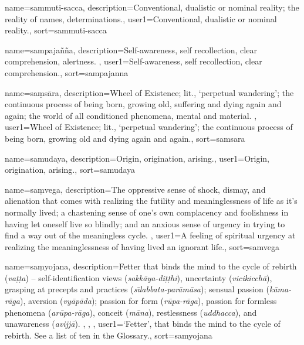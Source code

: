 {
name=sammuti-sacca,
description={Conventional, dualistic or nominal reality; the reality of names, determinations.},
user1={Conventional, dualistic or nominal reality.},
sort={sammuti-sacca}
}

{
name=sampaja\~n\~na,
description={Self-awareness, self recollection, clear comprehension, alertness. \protect \seepre %
\protect {}%
\protect \seepost %
},
user1={Self-awareness, self recollection, clear comprehension.},
sort={sampajanna}
}

{
name=sa\d{m}s\=ara,
description={Wheel of Existence; lit., `perpetual wandering'; the continuous process of being born, growing old, suffering and dying again and again; the world of all conditioned phenomena, mental and material. \protect \seepre %
\protect {}%
\protect \seepost %
},
user1={Wheel of Existence; lit., `perpetual wandering'; the continuous process of being born, growing old and dying again and again.},
sort={samsara}
}

{
name=samudaya,
description={Origin, origination, arising.},
user1={Origin, origination, arising.},
sort={samudaya}
}

{
name={sa\d{m}vega},
description={The oppressive sense of shock, dismay, and alienation that comes with realizing the futility and meaninglessness of life as it's normally lived; a chastening sense of one's own complacency and foolishness in having let oneself live so blindly; and an anxious sense of urgency in trying to find a way out of the meaningless cycle. \protect \seepre %
\protect {}%
\protect \seepost %
},
user1={A feeling of spiritual urgency at realizing the meaninglessness of having lived an ignorant life.},
sort={samvega}
}

{
name={sa\d{m}yojana},
description={Fetter that binds the mind to the cycle of rebirth (\textit{va\d{t}\d{t}a}) -- self-identification views (\textit{sakk\=aya-di\d{t}\d{t}hi}), uncertainty (\textit{vicikicch\=a}), grasping at precepts and practices (\textit{s\={\i}labbata-par\=am\=asa}); sensual passion (\textit{k\=ama-r\=aga}), aversion (\textit{vy\=ap\=ada}); passion for form (\textit{r\=upa-r\=aga}), passion for formless phenomena (\textit{ar\=upa-r\=aga}), conceit (\textit{m\=ana}), restlessness (\textit{uddhacca}), and unawareness (\textit{avijj\=a}). \protect \seepre %
\protect {}, \protect {}, \protect {}%
\protect \seepost %
},
user1={`Fetter', that binds the mind to the cycle of rebirth. See a list of ten in the Glossary.},
sort={samyojana}
}

